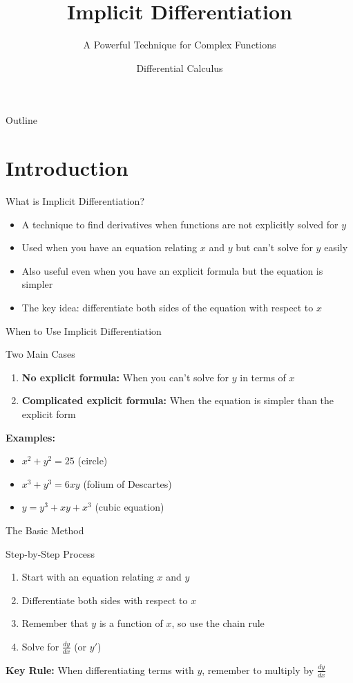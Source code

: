 \documentclass[aspectratio=169]{beamer}
\title{Implicit Differentiation}
\subtitle{A Powerful Technique for Complex Functions}
\author{Differential Calculus}
\date{}
\begin{document}
\begin{frame}
\titlepage
\end{frame}

\begin{frame}{Outline}
\tableofcontents
\end{frame}

\section{Introduction}

\begin{frame}{What is Implicit Differentiation?}
\begin{itemize}
  \item A technique to find derivatives when functions are not explicitly solved for $y$
  \item Used when you have an equation relating $x$ and $y$ but can't solve for $y$ easily
  \item Also useful even when you have an explicit formula but the equation is simpler
  \item The key idea: differentiate both sides of the equation with respect to $x$
\end{itemize}
\end{frame}

\begin{frame}{When to Use Implicit Differentiation}
\begin{block}{Two Main Cases}
\begin{enumerate}
  \item \textbf{No explicit formula:} When you can't solve for $y$ in terms of $x$
  \item \textbf{Complicated explicit formula:} When the equation is simpler than the explicit form
\end{enumerate}
\end{block}

\textbf{Examples:}
\begin{itemize}
  \item $x^2 + y^2 = 25$ (circle)
  \item $x^3 + y^3 = 6xy$ (folium of Descartes)
  \item $y = y^3 + xy + x^3$ (cubic equation)
\end{itemize}
\end{frame}

\begin{frame}{The Basic Method}
\begin{block}{Step-by-Step Process}
\begin{enumerate}
  \item Start with an equation relating $x$ and $y$
  \item Differentiate both sides with respect to $x$
  \item Remember that $y$ is a function of $x$, so use the chain rule
  \item Solve for $\frac{dy}{dx}$ (or $y'$)
\end{enumerate}
\end{block}

\textbf{Key Rule:} When differentiating terms with $y$, remember to multiply by $\frac{dy}{dx}$
\end{frame}
\end{document}
